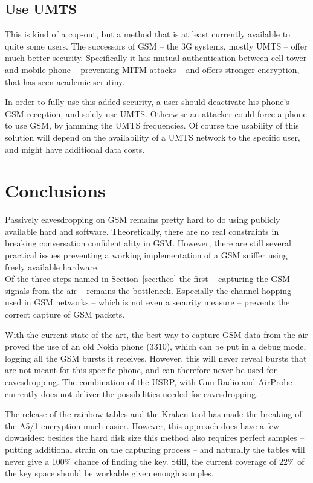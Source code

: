 \documentclass[a4paper,11pt]{llncs}
\begin{document}
\subsection{Use UMTS}
This is kind of a cop-out, but a method that is at least currently available to quite some users. The successors of GSM -- the 3G systems, mostly UMTS -- offer much better security. Specifically it has mutual authentication between cell tower and mobile phone -- preventing MITM attacks -- and offers stronger encryption, that has seen academic scrutiny.

In order to fully use this added security, a user should deactivate his phone's GSM reception, and solely use UMTS. Otherwise an attacker could force a phone to use GSM, by jamming the UMTS frequencies.
Of course the usability of this solution will depend on the availability of a UMTS network to the specific user, and might have additional data costs.

\section{Conclusions}
Passively eavesdropping on GSM remains pretty hard to do using publicly available hard and software. Theoretically, there are no real constraints in breaking conversation confidentiality in GSM. However, there are still several practical issues preventing a working implementation of a GSM sniffer using freely available hardware.\\

Of the three steps named in Section~\ref{sec:theo} the first -- capturing the GSM signals from the air -- remains the bottleneck. Especially the channel hopping used in GSM networks -- which is not even a security measure -- prevents the correct capture of GSM packets. 

With the current state-of-the-art, the best way to capture GSM data from the air proved the use of an old Nokia phone (3310), which can be put in a debug mode, logging all the GSM bursts it receives. However, this will never reveal bursts that are not meant for this specific phone, and can therefore never be used for eavesdropping. The combination of the USRP, with Gnu Radio and AirProbe currently does not deliver the possibilities needed for eavesdropping.

The release of the rainbow tables and the Kraken tool has made the breaking of the A5/1 encryption much easier. However, this approach does have a few downsides: besides the hard disk size this method also requires perfect samples -- putting additional strain on the capturing process -- and naturally the tables will never give a 100\% chance of finding the key. Still, the current coverage of 22\% of the key space should be workable given enough samples.\\
\end{document}
